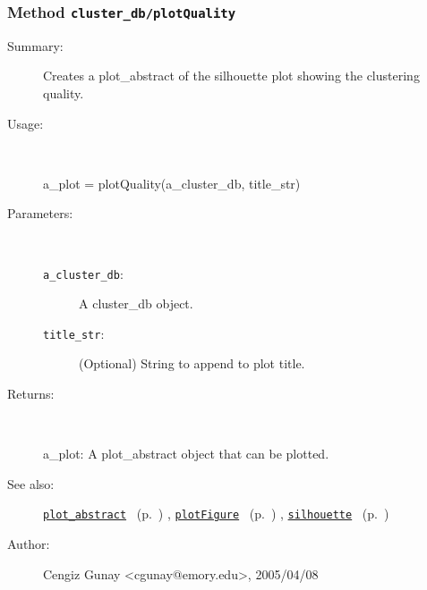 \subsubsection[Method \texttt{plotQuality}]{Method \texttt{cluster\_db/plotQuality}}%
%
\label{ref_cluster_db__plotQuality}%
\hypertarget{ref_cluster_db__plotQuality}{}%
\begin{description}
\item[Summary:]Creates a plot\_abstract of the silhouette plot showing the clustering quality.
%
\item[Usage:]~%
\begin{lyxcode}%
a\_plot = plotQuality(a\_cluster\_db, title\_str)
%
\end{lyxcode}%
%
%
\item[Parameters:]~
\begin{description}%
\item[\texttt{a\_cluster\_db}:]
 A cluster\_db object.
\item[\texttt{title\_str}:]
 (Optional) String to append to plot title.
\end{description}%
%
\item[Returns:
]~

	a\_plot: A plot\_abstract object that can be plotted.
%
%
\item[See also:]%
\hyperlink{ref_plot_abstract}{\texttt{plot\_abstract}}%
\ (p.~\pageref{ref_plot_abstract})%
%
, \hyperlink{ref_plotFigure}{\texttt{plotFigure}}%
\ (p.~\pageref{ref_plotFigure})%
%
, \hyperlink{ref_silhouette}{\texttt{silhouette}}%
\ (p.~\pageref{ref_silhouette})%
%
%
\item[Author:]%
Cengiz Gunay <cgunay@emory.edu>, 2005/04/08
%
\end{description}
\methodline%
